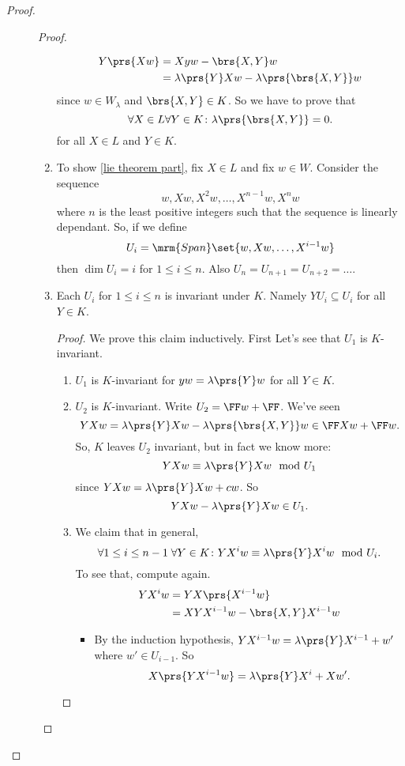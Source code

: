 \documentclass[10pt,a4paper,twoside,openany,hidelinks]{book}
\begin{document}
\begin{proof}
\begin{description}
\begin{proof}
\begin{enumerate}[label = \Roman*)]
\begin{align*}
Y\prs{Xw} &= Xyw - \brs{X,Y}w \\
&= \lambda\prs{Y} Xw - \lambda\prs{\brs{X,Y}}w
\end{align*}
since $w \in W_{\lambda}$ and $\brs{X,Y} \in K$.
So we have to prove that
\begin{equation} \label{lie theorem part}
\forall X \in L \forall Y \in K \colon \lambda\prs{\brs{X,Y}} = 0 \text{.}
\end{equation}
for all $X \in L$ and $Y \in K$.
\item To show \eqref{lie theorem part}, fix $X \in L$ and fix $w \in W$. Consider the sequence \[w, Xw, X^2w, \ldots, X^{n-1}w, X^nw\]
where $n$ is the least positive integers such that the sequence is linearly dependant.
So, if we define \[U_i = \mrm{Span}\set{w, Xw, \ldots, X^{i-1}w}\] then $\dim U_i = i$ for $1 \leq i \leq n$. Also $U_n = U_{n+1} =  U_{n+2} = \ldots$.
\item
\begin{claim}
Each $U_i$ for $1 \leq i \leq n$ is invariant under $K$. Namely $Y U_i \subseteq U_i$ for all $Y \in K$.
\end{claim}
\begin{proof}
We prove this claim inductively. First Let's see that $U_1$ is $K$-invariant.
\begin{enumerate}[label = (\roman*)]
\item $U_1$ is $K$-invariant for $yw = \lambda\prs{Y} w$ for all $Y \in K$.
\item $U_2$ is $K$-invariant. Write $U_2 = \FF w + \FF$. We've seen
\[YXw = \lambda\prs{Y}Xw - \lambda\prs{\brs{X,Y}}w \in \FF Xw + \FF w\text{.}\]
So, $K$ leaves $U_2$ invariant, but in fact we know more:
\[YXw \equiv \lambda\prs{Y} Xw \mod{U_1}\]
since $YXw = \lambda\prs{Y} Xw + cw$. So
\[YXw - \lambda\prs{Y}Xw \in U_1\text{.}\]
\item We claim that in general, \begin{equation}\label{star}\forall 1 \leq i \leq n-1 \; \forall Y \in K \colon Y X^i w \equiv \lambda\prs{Y} X^i w \mod{U_i}\text{.}\end{equation}
To see that, compute again.
\begin{align*}
YX^i w &= YX\prs{X^{i-1}w} \\ &= XYX^{i-1}w - \brs{X,Y} X^{i-1} w 
\end{align*}
\begin{itemize}
\item
By the induction hypothesis, $YX^{i-1}w = \lambda\prs{Y} X^{i-1} + w'$ where $w' \in U_{i-1}$. So \[X\prs{YX^{i-1}w} = \lambda\prs{Y}X^{i} + Xw'\text{.}\]

\end{itemize}
\end{enumerate}
\end{proof}
\end{enumerate}
\end{proof}
\end{description}
\end{proof}
\end{document}
